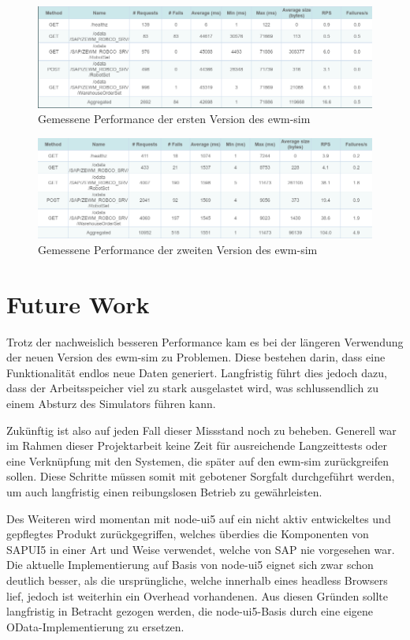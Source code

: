 \begin{figure}[!ht]
	\centering
	\includegraphics[width=\textwidth]{Bilder/perf-v1.png}
	\caption{Gemessene Performance der ersten Version des \ac{ewm-sim}}
	\label{fig:perf-v1}
\end{figure}

\begin{figure}[!ht]
	\centering
	\includegraphics[width=\textwidth]{Bilder/perf-v2.png}
	\caption{Gemessene Performance der zweiten Version des \ac{ewm-sim}}
	\label{fig:perf-v2}
\end{figure}

\section{Future Work}
Trotz der nachweislich besseren Performance kam es bei der längeren Verwendung der neuen Version des \ac{ewm-sim} zu Problemen.
Diese bestehen darin, dass eine Funktionalität endlos neue Daten generiert.
Langfristig führt dies jedoch dazu, dass der Arbeitsspeicher viel zu stark ausgelastet wird, was schlussendlich zu einem Absturz des Simulators führen kann.

Zukünftig ist also auf jeden Fall dieser Missstand noch zu beheben.
Generell war im Rahmen dieser Projektarbeit keine Zeit für ausreichende Langzeittests oder eine Verknüpfung mit den Systemen, die später auf den \ac{ewm-sim} zurückgreifen sollen.
Diese Schritte müssen somit mit gebotener Sorgfalt durchgeführt werden, um auch langfristig einen reibungslosen Betrieb zu gewährleisten.

Des Weiteren wird momentan mit node-ui5 auf ein nicht aktiv entwickeltes und gepflegtes Produkt zurückgegriffen, welches überdies die Komponenten von SAPUI5 in einer Art und Weise verwendet, welche von SAP nie vorgesehen war.
Die aktuelle Implementierung auf Basis von node-ui5 eignet sich zwar schon deutlich besser, als die ursprüngliche, welche innerhalb eines headless Browsers lief, jedoch ist weiterhin ein Overhead vorhandenen.
Aus diesen Gründen sollte langfristig in Betracht gezogen werden, die node-ui5-Basis durch eine eigene OData-Implementierung zu ersetzen.


